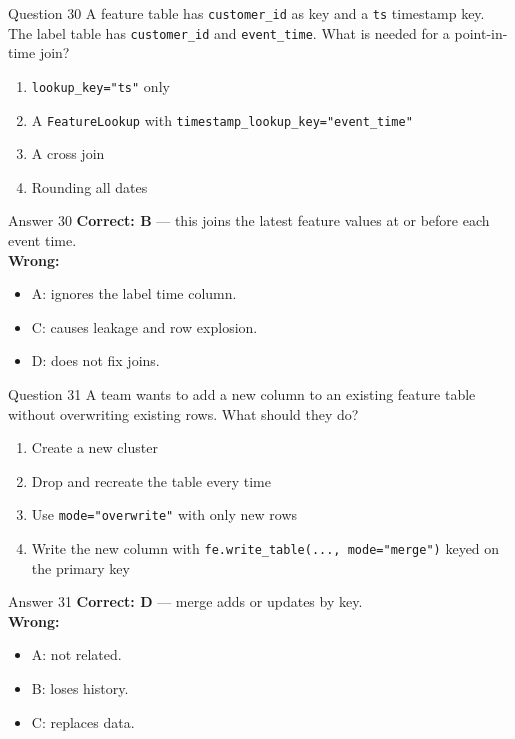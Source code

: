 \documentclass[aspectratio=169,11pt]{beamer}
\begin{document}
\begin{frame}{Question 30}
A feature table has \texttt{customer\_id} as key and a \texttt{ts} timestamp key. The label table has \texttt{customer\_id} and \texttt{event\_time}. What is needed for a point-in-time join?
\begin{enumerate}[label=\Alph*.]
\item \texttt{lookup\_key="ts"} only
\item A \texttt{FeatureLookup} with \texttt{timestamp\_lookup\_key="event\_time"}
\item A cross join
\item Rounding all dates
\end{enumerate}
\end{frame}
\begin{frame}{Answer 30}
\textbf{Correct: B} --- this joins the latest feature values at or before each event time.\\
\vspace{0.5em}
\textbf{Wrong:}
\begin{itemize}
\item A: ignores the label time column.
\item C: causes leakage and row explosion.
\item D: does not fix joins.
\end{itemize}
\end{frame}

\begin{frame}{Question 31}
A team wants to add a new column to an existing feature table without overwriting existing rows. What should they do?
\begin{enumerate}[label=\Alph*.]
\item Create a new cluster
\item Drop and recreate the table every time
\item Use \texttt{mode="overwrite"} with only new rows
\item Write the new column with \texttt{fe.write\_table(..., mode="merge")} keyed on the primary key
\end{enumerate}
\end{frame}
\begin{frame}{Answer 31}
\textbf{Correct: D} --- merge adds or updates by key.\\
\vspace{0.5em}
\textbf{Wrong:}
\begin{itemize}
\item A: not related.
\item B: loses history.
\item C: replaces data.
\end{itemize}
\end{frame}
\end{document}
